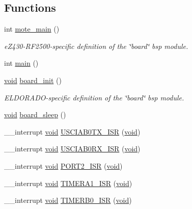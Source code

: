 \subsection*{Functions}
\begin{DoxyCompactItemize}
\item 
int \hyperlink{ez430-rf2500_2board_8c_a250f6a5899d659eb4f937ca9ceef255b}{mote\+\_\+main} ()
\begin{DoxyCompactList}\small\item\em e\+Z430-\/\+R\+F2500-\/specific definition of the \char`\"{}board\char`\"{} bsp module. \end{DoxyCompactList}\item 
int \hyperlink{ez430-rf2500_2board_8c_ae66f6b31b5ad750f1fe042a706a4e3d4}{main} ()
\item 
\hyperlink{usb__devapi_8h_afabf60e7f57651d6d595a02c75f07cd0}{void} \hyperlink{group__board_ga916f2adc2080b4fe88034086d107a8dc}{board\+\_\+init} ()
\begin{DoxyCompactList}\small\item\em E\+L\+D\+O\+R\+A\+D\+O-\/specific definition of the \char`\"{}board\char`\"{} bsp module. \end{DoxyCompactList}\item 
\hyperlink{usb__devapi_8h_afabf60e7f57651d6d595a02c75f07cd0}{void} \hyperlink{group__board_ga052cfe534a52d7f046e311d4adec00a8}{board\+\_\+sleep} ()
\item 
\+\_\+\+\_\+interrupt \hyperlink{usb__devapi_8h_afabf60e7f57651d6d595a02c75f07cd0}{void} \hyperlink{ez430-rf2500_2board_8c_ace3c646aeda748bc89f1536876440b03}{U\+S\+C\+I\+A\+B0\+T\+X\+\_\+\+I\+SR} (\hyperlink{usb__devapi_8h_afabf60e7f57651d6d595a02c75f07cd0}{void})
\item 
\+\_\+\+\_\+interrupt \hyperlink{usb__devapi_8h_afabf60e7f57651d6d595a02c75f07cd0}{void} \hyperlink{ez430-rf2500_2board_8c_a1c27b12dfd9998dbc915bee092a83447}{U\+S\+C\+I\+A\+B0\+R\+X\+\_\+\+I\+SR} (\hyperlink{usb__devapi_8h_afabf60e7f57651d6d595a02c75f07cd0}{void})
\item 
\+\_\+\+\_\+interrupt \hyperlink{usb__devapi_8h_afabf60e7f57651d6d595a02c75f07cd0}{void} \hyperlink{ez430-rf2500_2board_8c_a6ddfaf32b7620184897c858c576dc5a3}{P\+O\+R\+T2\+\_\+\+I\+SR} (\hyperlink{usb__devapi_8h_afabf60e7f57651d6d595a02c75f07cd0}{void})
\item 
\+\_\+\+\_\+interrupt \hyperlink{usb__devapi_8h_afabf60e7f57651d6d595a02c75f07cd0}{void} \hyperlink{ez430-rf2500_2board_8c_a61bc247e10ee3cdd627502c2c028bca3}{T\+I\+M\+E\+R\+A1\+\_\+\+I\+SR} (\hyperlink{usb__devapi_8h_afabf60e7f57651d6d595a02c75f07cd0}{void})
\item 
\+\_\+\+\_\+interrupt \hyperlink{usb__devapi_8h_afabf60e7f57651d6d595a02c75f07cd0}{void} \hyperlink{ez430-rf2500_2board_8c_a78d1aa50c2b3b7f61cb71a152d67dc44}{T\+I\+M\+E\+R\+B0\+\_\+\+I\+SR} (\hyperlink{usb__devapi_8h_afabf60e7f57651d6d595a02c75f07cd0}{void})
\end{DoxyCompactItemize}


